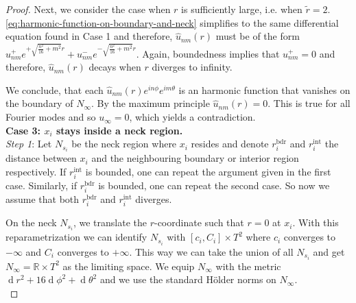 \documentclass[preprint,12pt]{elsarticle}
\numberwithin{table}{section}
\newcommand{\R}{\mathbb{R}}
\renewcommand{\d}{\operatorname{d}\!}
\begin{document}
\begin{proof}
	Next, we consider the case when $r$ is sufficiently large, i.e. when $\tilde{r} = 2$. \cref{eq:harmonic-function-on-boundary-and-neck} simplifies to the same differential equation found in Case 1 and therefore, $\hat{u}_{nm} (r)$ must be of the form $u^+_{nm} e^{+ \sqrt{\frac{n^2}{16} + m^2} r} + u^-_{nm} e^{- \sqrt{\frac{n^2}{16} + m^2} r}$. Again, boundedness implies that $u^+_{nm} = 0$ and therefore, $\hat{u}_{nm}(r)$ decays when $r$ diverges to infinity.

	We conclude, that each $\hat{u}_{nm}(r) e^{in\phi} e^{im \theta}$ is an harmonic function that vanishes on the boundary of $N_\infty$. By the maximum principle $\hat{u}_{nm}(r) = 0$. This is true for all Fourier modes and so $u_\infty = 0$, which yields a contradiction.
	\\

	\noindent
	\textbf{Case 3: $x_i$ stays inside a neck region.} \\
	\textit{Step 1}: Let $N_{s_i}$ be the neck region where $x_i$ resides and denote $r^{\mathrm{bdr}}_i$ and $r^{\mathrm{int}}_i$ the distance between $x_i$ and the neighbouring boundary or interior region respectively. If $r^{\mathrm{int}}_i$ is bounded, one can repeat the argument given in the first case. Similarly, if $r^{\mathrm{bdr}}_i$ is bounded, one can repeat the second case. So now we assume that both $r^{\mathrm{bdr}}_i$ and $r^{\mathrm{int}}_i$ diverges.

	On the neck $N_{s_i}$, we translate the $r$-coordinate such that $r = 0$ at $x_i$. With this reparametrization we can identify $N_{s_i}$ with $[c_i, C_i] \times T^2$ where $c_i$ converges to $- \infty$ and $C_i$ converges to $+ \infty$. This way we can take the union of all $N_{s_i}$ and get $N_\infty = \R \times T^2$ as the limiting space. We equip $N_\infty$ with the metric $\d r^2 + 16 \d \phi^2 + \d \theta^2$ and we use the standard H\"older norms on $N_\infty$.
	\\


\end{proof}
\end{document}
